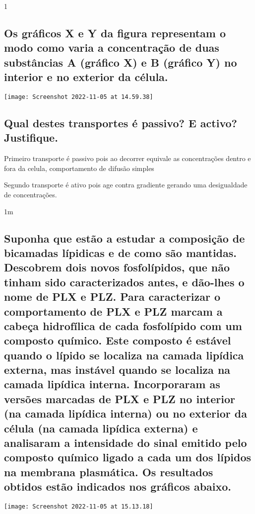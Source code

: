\documentclass[\mainfilename]{subfiles}
\begin{document}
\begin{questionBox}1{} %
    
    \subsection*{Os gráficos X e Y da figura representam o modo como varia a concentração de duas substâncias A (gráfico X) e B (gráfico Y) no interior e no exterior da célula.}

    \begin{center}
        \texttt{[image: Screenshot 2022-11-05 at 14.59.38]}
    \end{center}

    \subsection*{Qual destes transportes é passivo? E activo? Justifique.}
    
    \begin{answerBox}{} %
        Primeiro transporte é passivo pois ao decorrer equivale as concentrações dentro e fora da celula, comportamento de difusão simples
    
        Segundo transporte é ativo pois age contra gradiente gerando uma desigualdade de concentrações.
    \end{answerBox}
    
\end{questionBox}


\begin{questionBox}1m{} %
    
    \subsection*{Suponha que estão a estudar a composição de bicamadas lípidicas e de como são mantidas. Descobrem dois novos fosfolípidos, que não tinham sido caracterizados antes, e dão-lhes o nome de PLX e PLZ. Para caracterizar o comportamento de PLX e PLZ marcam a cabeça hidrofílica de cada fosfolípido com um composto químico. Este composto é estável quando o lípido se localiza na camada lipídica externa, mas instável quando se localiza na camada lipídica interna. Incorporaram as versões marcadas de PLX e PLZ no interior (na camada lipídica interna) ou no exterior da célula (na camada lipídica externa) e analisaram a intensidade do sinal emitido pelo composto químico ligado a cada um dos lípidos na membrana plasmática. Os resultados obtidos estão indicados nos gráficos abaixo.}

    \begin{center}
        \texttt{[image: Screenshot 2022-11-05 at 15.13.18]}
    \end{center}

    
\end{questionBox}
\end{document}
